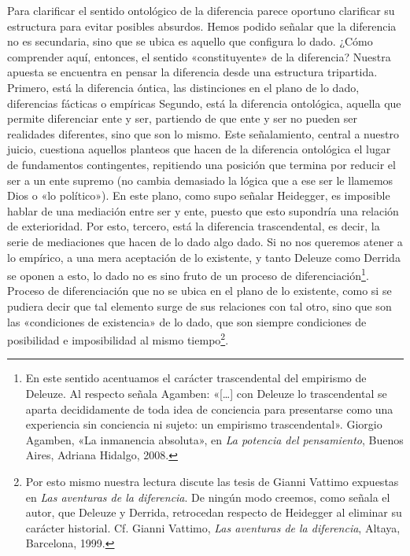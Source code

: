 Para clarificar el sentido ontológico de la diferencia parece oportuno clarificar su estructura para evitar posibles absurdos. Hemos podido señalar que la diferencia no es secundaria, sino que se ubica es aquello que configura lo dado. ¿Cómo comprender aquí, entonces, el sentido «constituyente» de la diferencia? Nuestra apuesta se encuentra en pensar la diferencia desde una estructura tripartida. Primero, está la diferencia óntica, las distinciones en el plano de lo dado, diferencias fácticas o empíricas Segundo, está la diferencia ontológica, aquella que permite diferenciar ente y ser, partiendo de que ente y ser no pueden ser realidades diferentes, sino que son lo mismo. Este señalamiento, central a nuestro juicio, cuestiona aquellos planteos que hacen de la diferencia ontológica el lugar de fundamentos contingentes, repitiendo una posición que termina por reducir el ser a un ente supremo (no cambia demasiado la lógica que a ese ser le llamemos Dios o «lo político»). En este plano, como supo señalar Heidegger, es imposible hablar de una mediación entre ser y ente, puesto que esto supondría una relación de exterioridad. Por esto, tercero, está la diferencia trascendental, es decir, la serie de mediaciones que hacen de lo dado algo dado. Si no nos queremos atener a lo empírico, a una mera aceptación de lo existente, y tanto Deleuze como Derrida se oponen a esto, lo dado no es sino fruto de un proceso de diferenciación\footnote{En este sentido acentuamos el carácter trascendental del empirismo de Deleuze. Al respecto señala Agamben: «{[}\ldots{]} con Deleuze lo trascendental se aparta decididamente de toda idea de conciencia para presentarse como una experiencia sin conciencia ni sujeto: un empirismo trascendental». Giorgio Agamben, «La inmanencia absoluta», en \emph{La potencia del pensamiento}, Buenos Aires, Adriana Hidalgo, 2008.}. Proceso de diferenciación que no se ubica en el plano de lo existente, como si se pudiera decir que tal elemento surge de sus relaciones con tal otro, sino que son las «condiciones de existencia» de lo dado, que son siempre condiciones de posibilidad e imposibilidad al mismo tiempo\footnote{Por esto mismo nuestra lectura discute las tesis de Gianni Vattimo expuestas en \emph{Las aventuras de la diferencia}. De ningún modo creemos, como señala el autor, que Deleuze y Derrida, retrocedan respecto de Heidegger al eliminar su carácter historial. Cf. Gianni Vattimo, \emph{Las aventuras de la diferencia}, Altaya, Barcelona, 1999.}.

